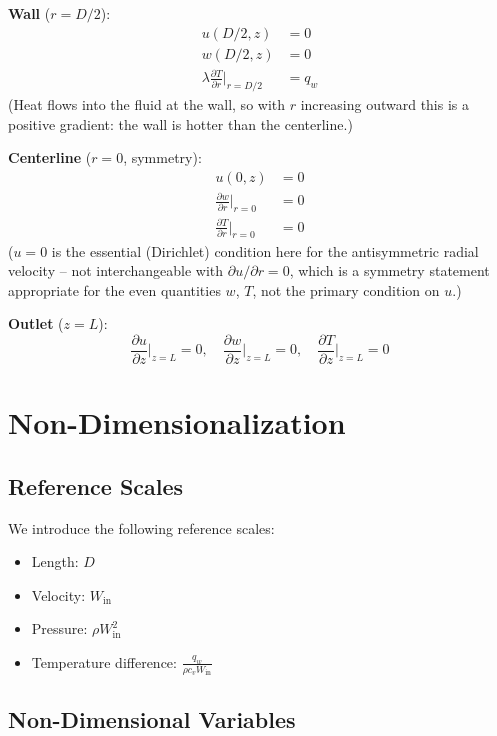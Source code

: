 \documentclass[12pt,a4paper]{article}
\newcommand{\parder}[2]{\frac{\partial #1}{\partial #2}}
\begin{document}
\textbf{Wall} ($r = D/2$):
\begin{align}
    u(D/2, z) &= 0 \\
    w(D/2, z) &= 0 \\
    \lambda\parder{T}{r}\bigg|_{r=D/2} &= q_w
\end{align}
(Heat flows into the fluid at the wall, so with $r$ increasing outward this is a
positive gradient: the wall is hotter than the centerline.)

\textbf{Centerline} ($r = 0$, symmetry):
\begin{align}
    u(0, z) &= 0 \\
    \parder{w}{r}\bigg|_{r=0} &= 0 \\
    \parder{T}{r}\bigg|_{r=0} &= 0
\end{align}
($u=0$ is the essential (Dirichlet) condition here for the antisymmetric radial
velocity -- not interchangeable with $\partial u/\partial r=0$, which is a symmetry
statement appropriate for the even quantities $w$, $T$, not the primary condition on $u$.)

\textbf{Outlet} ($z = L$):
\begin{equation}
    \parder{u}{z}\bigg|_{z=L} = 0, \quad \parder{w}{z}\bigg|_{z=L} = 0, \quad \parder{T}{z}\bigg|_{z=L} = 0
\end{equation}

\newpage

\section{Non-Dimensionalization}

\subsection{Reference Scales}

We introduce the following reference scales:
\begin{itemize}
    \item Length: $D$
    \item Velocity: $W_{\text{in}}$
    \item Pressure: $\rho W_{\text{in}}^2$
    \item Temperature difference: $\frac{q_w}{\rho c_v W_{\text{in}}}$
\end{itemize}

\subsection{Non-Dimensional Variables}
\end{document}
